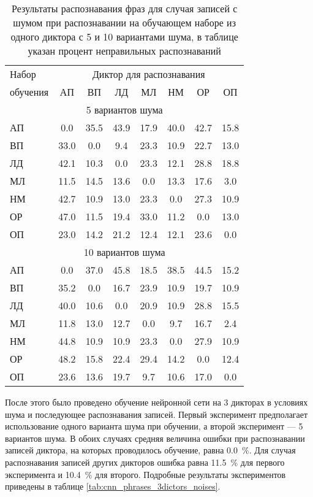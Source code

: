 \begin{table}[h]
	\centering
	\caption{Результаты распознавания фраз для случая записей с шумом при распознавании на обучающем наборе из одного диктора с 5 и 10 вариантами шума, в таблице указан процент неправильных распознаваний}
	\label{tab:cnn_phrases_1dictor_noises}
	\begin{tabular}{| l | c | c | c | c | c | c | c |}
		\hline
		Набор & \multicolumn{7}{c|}{Диктор для распознавания} \\
		\hhline{~-------}
		обучения \phantom{0000} & \phantom{0} АП \phantom{0} & \phantom{0} ВП \phantom{0} & \phantom{0} ЛД \phantom{0} & \phantom{0} МЛ \phantom{0} & \phantom{0} НМ \phantom{0} & \phantom{0} ОР \phantom{0} & \phantom{0} ОП \phantom{0} \\
		\hline
		\multicolumn{8}{|c|}{5 вариантов шума} \\
		\hline
		АП 		 &  0.0 & 35.5 & 43.9 & 17.9 & 40.0 & 42.7 & 15.8 \\
		ВП 		 & 33.0 &  0.0 &  9.4 & 23.3 & 10.9 & 22.7 & 13.0 \\
		ЛД		 & 42.1 & 10.3 &  0.0 & 23.3 & 12.1 & 28.8 & 18.8 \\
		МЛ		 & 11.5 & 14.5 & 13.6 &  0.0 & 13.3 & 17.6 &  3.0 \\
		НМ		 & 42.7 & 10.9 & 13.0 & 23.3 &  0.0 & 27.3 & 10.9 \\
		ОР		 & 47.0 & 11.5 & 19.4 & 33.0 & 11.2 &  0.0 & 13.0 \\
		ОП		 & 23.0 & 14.2 & 21.2 & 12.4 & 12.1 & 23.6 &  0.0 \\
		\hline
		\multicolumn{8}{|c|}{10 вариантов шума} \\
		\hline
		АП		 &  0.0 & 37.0 & 45.8 & 18.5 & 38.5 & 44.5 & 15.2 \\
		ВП		 & 35.2 &  0.0 & 16.7 & 23.9 & 10.9 & 19.7 & 10.9 \\
		ЛД		 & 40.0 & 10.6 &  0.0 & 20.9 & 10.9 & 28.8 & 15.5 \\
		МЛ		 & 11.8 & 13.0 & 12.7 &  0.0 &  9.7 & 16.7 &  2.4 \\
		НМ		 & 44.8 & 10.9 & 10.9 & 23.3 &  0.0 & 27.9 & 10.9 \\
		ОР		 & 48.2 & 15.8 & 22.4 & 29.4 & 14.2 &  0.0 & 12.4 \\
		ОП		 & 23.6 & 13.6 & 19.7 &  9.7 & 10.6 & 17.0 &  0.0 \\
		\hline
	\end{tabular}
\end{table}

После этого было проведено обучение нейронной сети на 3 дикторах в условиях шума и последующее распознавания записей.
Первый эксперимент предполагает использование одного варианта шума при обучении, а второй эксперимент --- 5 вариантов шума.
В обоих случаях средняя величина ошибки при распознавании записей диктора, на которых проводилось обучение, равна 0.0~\%.
Для случая распознавания записей других дикторов ошибка равна 11.5~\% для первого эксперимента и 10.4~\% для второго.
Подробные результаты экспериментов приведены в таблице \ref{tab:cnn_phrases_3dictors_noises}.

